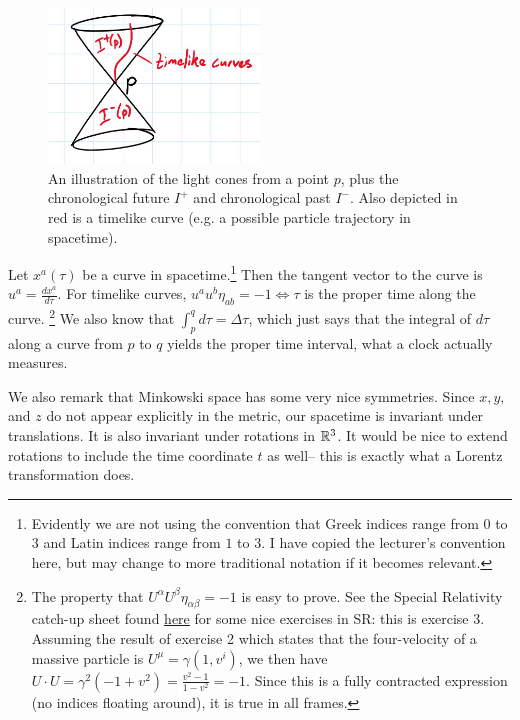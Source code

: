 \begin{figure}
\includegraphics[width=0.5\textwidth]{2018/10/20181005_img1}
\caption{An illustration of the light cones from a point $p$, plus the chronological future $I^+$ and chronological past $I^-$. Also depicted in red is a timelike curve (e.g. a possible particle trajectory in spacetime).}
\end{figure}

Let $x^a(\tau)$ be a curve in spacetime.\footnote{Evidently we are not using the convention that Greek indices range from $0$ to $3$ and Latin indices range from $1$ to $3$. I have copied the lecturer's convention here, but may change to more traditional notation if it becomes relevant.} Then the tangent vector to the curve is $u^a=\frac{dx^a}{d\tau}$. For timelike curves, $u^a u^b \eta_{ab}=-1 \iff \tau$ is the proper time along the curve.
\footnote{The property that $U^\alpha U^\beta \eta_{\alpha\beta}=-1$ is easy to prove. See the Special Relativity catch-up sheet found \href{http://www.maths.cam.ac.uk/sites/www.maths.cam.ac.uk/files/grspecialrelativity.pdf}{here} for some nice exercises in SR: this is exercise 3. Assuming the result of exercise 2 which states that the four-velocity of a massive particle is $U^\mu=\gamma(1,v^i)$, we then have $U\cdot U =\gamma^2(-1+v^2)=\frac{v^2-1}{1-v^2}=-1$. Since this is a fully contracted expression (no indices floating around), it is true in all frames.}
We also know that $\int_p^q d\tau = \Delta \tau$, which just says that the integral of $d\tau$ along a curve from $p$ to $q$ yields the proper time interval, what a clock actually measures.

We also remark that Minkowski space has some very nice symmetries. Since $x,y,$ and $z$ do not appear explicitly in the metric, our spacetime is invariant under translations. It is also invariant under rotations in $\mathbb{R}^3$. It would be nice to extend rotations to include the time coordinate $t$ as well-- this is exactly what a Lorentz transformation does.

